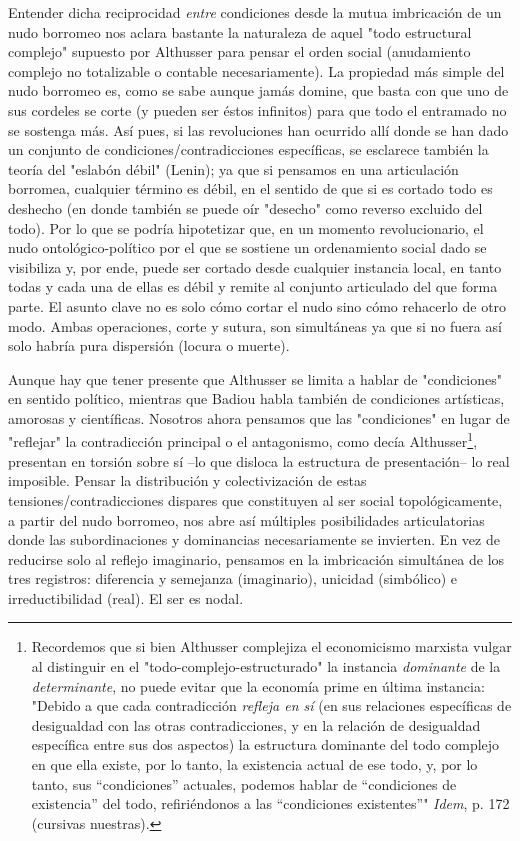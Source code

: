 \documentclass{book}
\begin{document}
Entender dicha reciprocidad \emph{entre} condiciones desde la mutua
imbricación de un nudo borromeo nos aclara bastante la naturaleza de
aquel "todo estructural complejo" supuesto por Althusser para pensar el
orden social (anudamiento complejo no totalizable o contable
necesariamente). La propiedad más simple del nudo borromeo es, como se
sabe aunque jamás domine, que basta con que uno de sus cordeles se corte
(y pueden ser éstos infinitos) para que todo el entramado no se sostenga
más. Así pues, si las revoluciones han ocurrido allí donde se han dado
un conjunto de condiciones/contradicciones específicas, se esclarece
también la teoría del "eslabón débil" (Lenin); ya que si pensamos en una
articulación borromea, cualquier término es débil, en el sentido de que
si es cortado todo es deshecho (en donde también se puede oír "desecho"
como reverso excluido del todo). Por lo que se podría hipotetizar que,
en un momento revolucionario, el nudo ontológico-político por el que se
sostiene un ordenamiento social dado se visibiliza y, por ende, puede
ser cortado desde cualquier instancia local, en tanto todas y cada una
de ellas es débil y remite al conjunto articulado del que forma parte.
El asunto clave no es solo cómo cortar el nudo sino cómo rehacerlo de
otro modo. Ambas operaciones, corte y sutura, son simultáneas ya que si
no fuera así solo habría pura dispersión (locura o muerte).

Aunque hay que tener presente que Althusser se limita a hablar de
"condiciones" en sentido político, mientras que Badiou habla también de
condiciones artísticas, amorosas y científicas. Nosotros ahora pensamos
que las "condiciones" en lugar de "reflejar" la contradicción principal
o el antagonismo, como decía Althusser\footnote{Recordemos que si bien
  Althusser complejiza el economicismo marxista vulgar al distinguir en
  el "todo-complejo-estructurado" la instancia \emph{dominante} de la
  \emph{determinante}, no puede evitar que la economía prime en última
  instancia: "Debido a que cada contradicción \emph{refleja en sí} (en
  sus relaciones específicas de desigualdad con las otras
  contradicciones, y en la relación de desigualdad específica entre sus
  dos aspectos) la estructura dominante del todo complejo en que ella
  existe, por lo tanto, la existencia actual de ese todo, y, por lo
  tanto, sus ``condiciones'' actuales, podemos hablar de ``condiciones
  de existencia'' del todo, refiriéndonos a las ``condiciones
  existentes''" \emph{Idem}, p. 172 (cursivas nuestras).}, presentan en
torsión sobre sí --lo que disloca la estructura de presentación-- lo
real imposible. Pensar la distribución y colectivización de estas
tensiones/contradicciones dispares que constituyen al ser social
topológicamente, a partir del nudo borromeo, nos abre así múltiples
posibilidades articulatorias donde las subordinaciones y dominancias
necesariamente se invierten. En vez de reducirse solo al reflejo
imaginario, pensamos en la imbricación simultánea de los tres registros:
diferencia y semejanza (imaginario), unicidad (simbólico) e
irreductibilidad (real). El ser es nodal.
\end{document}
